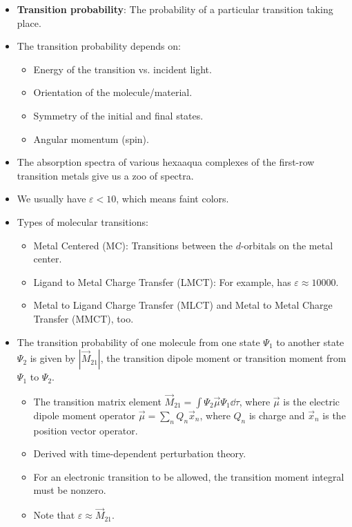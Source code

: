 \documentclass[../notes.tex]{subfiles}
\begin{document}
\begin{itemize}
    \item \textbf{Transition probability}: The probability of a particular transition taking place.
    \item The transition probability depends on:
    \begin{itemize}
        \item Energy of the transition vs. incident light.
        \item Orientation of the molecule/material.
        \item Symmetry of the initial and final states.
        \item Angular momentum (spin).
    \end{itemize}
    \item The absorption spectra of various hexaaqua complexes of the first-row transition metals give us a zoo of spectra.
    \item We usually have $\varepsilon<10$, which means faint colors.
    \item Types of molecular transitions:
    \begin{itemize}
        \item Metal Centered (MC): Transitions between the $d$-orbitals on the metal center.
        \item Ligand to Metal Charge Transfer (LMCT): For example,  has $\varepsilon\approx\num{10000}$.
        \item Metal to Ligand Charge Transfer (MLCT) and Metal to Metal Charge Transfer (MMCT), too.
    \end{itemize}
    \item The transition probability of one molecule from one state $\Psi_1$ to another state $\Psi_2$ is given by $|\vec{M}_{21}|$, the transition dipole moment or transition moment from $\Psi_1$ to $\Psi_2$.
    \begin{itemize}
        \item The transition matrix element $\vec{M}_{21}=\int\Psi_2\vec{\mu}\Psi_1\dd{\tau}$, where $\vec{\mu}$ is the electric dipole moment operator $\vec{\mu}=\sum_nQ_n\vec{x}_n$, where $Q_n$ is charge and $\vec{x}_n$ is the position vector operator.
        \item Derived with time-dependent perturbation theory.
        \item For an electronic transition to be allowed, the transition moment integral must be nonzero.
        \item Note that $\varepsilon\approx\vec{M}_{21}$.
    \end{itemize}

\end{itemize}
\end{document}
